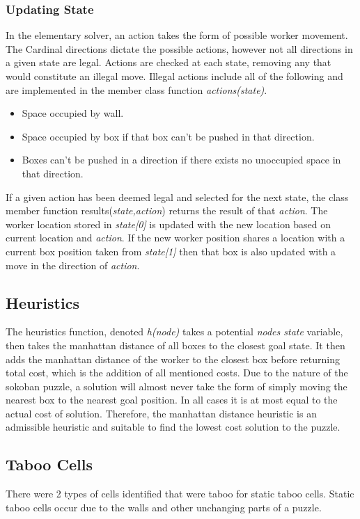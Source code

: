 \documentclass[]{article}
\begin{document}
\subsubsection{Updating State}
In the elementary solver, an action takes the form of possible worker movement. The Cardinal directions dictate the possible actions, however not all directions in a given state are legal. Actions are checked at each state, removing any that would constitute an illegal move. Illegal actions include all of the following and are implemented in the member class function \textit{actions(state)}.
\begin{itemize}
	\item Space occupied by wall.
	\item Space occupied by box if that box can't be pushed in that direction.
	\item Boxes can't be pushed in a direction if there exists no unoccupied space in that direction.
\end{itemize}
If a given action has been deemed legal and selected for the next state, the class member function results(\textit{state,action}) returns the result of that \textit{action}. The worker location stored in \textit{state[0]} is updated with the new location based on current location and \textit{action}. If the new worker position shares a location with a current box position taken from \textit{state[1]} then that box is also updated with a move in the direction of \textit{action}.
\subsection{Heuristics}
The heuristics function, denoted \textit{h(node)} takes a potential \textit{nodes state} variable, then takes the manhattan distance of all boxes to the closest goal state. It then adds the manhattan distance of the worker to the closest box before returning total cost, which is the addition of all mentioned costs. Due to the nature of the sokoban puzzle, a solution will almost never take the form of simply moving the nearest box to the nearest goal position. In all cases it is at most equal to the actual cost of solution. Therefore, the manhattan distance heuristic is an admissible heuristic and suitable to find the lowest cost solution to the puzzle. 
\subsection{Taboo Cells}
There were 2 types of cells identified that were taboo for static taboo cells. Static taboo cells occur due to the walls and other unchanging parts of a puzzle.
\end{document}
